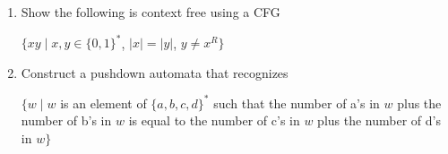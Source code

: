 \documentclass{article}
\begin{document}
\begin{enumerate}
        \item Show the following is context free using a CFG
            \begin{center}
                $\{xy \mid x,y\in \{0,1\}^*$, $ |x|=|y|$, $ y\not= x^R\}$
            \end{center}

        \item Construct a pushdown automata that recognizes
            \begin{center}
                $\{w\mid w $ is an element of $\{a,b,c,d\}^* $ such that the number of a's in $w$ plus the number of b's in $w$ is equal to the number of c's in $w$ plus the number of d's in $w \}$
            \end{center}
    \end{enumerate}
\end{document}
